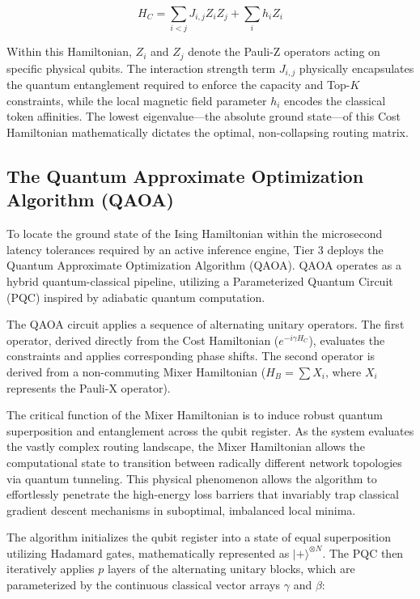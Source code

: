 \documentclass[11pt,a4paper]{article}
\begin{document}
$$H_C = \sum_{i<j} J_{i,j} Z_i Z_j + \sum_i h_i Z_i$$

Within this Hamiltonian, $Z_i$ and $Z_j$ denote the Pauli-Z operators acting on specific physical qubits. The interaction strength term $J_{i,j}$ physically encapsulates the quantum entanglement required to enforce the capacity and Top-$K$ constraints, while the local magnetic field parameter $h_i$ encodes the classical token affinities. The lowest eigenvalue---the absolute ground state---of this Cost Hamiltonian mathematically dictates the optimal, non-collapsing routing matrix.

\subsection{The Quantum Approximate Optimization Algorithm (QAOA)}

To locate the ground state of the Ising Hamiltonian within the microsecond latency tolerances required by an active inference engine, Tier 3 deploys the Quantum Approximate Optimization Algorithm (QAOA). QAOA operates as a hybrid quantum-classical pipeline, utilizing a Parameterized Quantum Circuit (PQC) inspired by adiabatic quantum computation.

The QAOA circuit applies a sequence of alternating unitary operators. The first operator, derived directly from the Cost Hamiltonian ($e^{-i\gamma H_C}$), evaluates the constraints and applies corresponding phase shifts. The second operator is derived from a non-commuting Mixer Hamiltonian ($H_B = \sum X_i$, where $X_i$ represents the Pauli-X operator).

The critical function of the Mixer Hamiltonian is to induce robust quantum superposition and entanglement across the qubit register. As the system evaluates the vastly complex routing landscape, the Mixer Hamiltonian allows the computational state to transition between radically different network topologies via quantum tunneling. This physical phenomenon allows the algorithm to effortlessly penetrate the high-energy loss barriers that invariably trap classical gradient descent mechanisms in suboptimal, imbalanced local minima.

The algorithm initializes the qubit register into a state of equal superposition utilizing Hadamard gates, mathematically represented as $|+\rangle^{\otimes N}$. The PQC then iteratively applies $p$ layers of the alternating unitary blocks, which are parameterized by the continuous classical vector arrays $\gamma$ and $\beta$:
\end{document}
